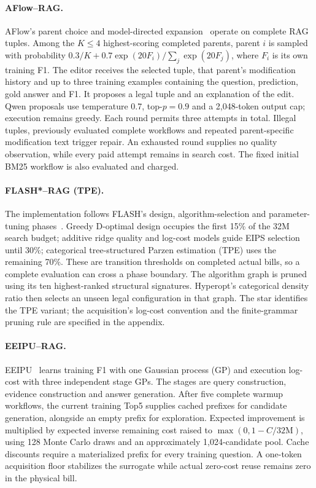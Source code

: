 \paragraph{AFlow--RAG.}
AFlow's parent choice and model-directed expansion~\citep{zhang2024aflow}
operate on complete RAG tuples. Among the $K\leq4$ highest-scoring completed
parents, parent $i$ is sampled with probability
$0.3/K+0.7\exp(20F_i)/\sum_j\exp(20F_j)$, where $F_i$ is its own training
F1. The editor receives the selected tuple, that parent's modification
history and up to three training examples containing the question,
prediction, gold answer and F1. It proposes a legal tuple and an explanation
of the edit. Qwen proposals use temperature 0.7, top-$p=0.9$ and a
2,048-token output cap; execution remains greedy. Each round permits three
attempts in total. Illegal tuples, previously evaluated complete workflows
and repeated parent-specific modification text trigger repair. An exhausted
round supplies no quality observation, while every paid attempt remains in
search cost. The fixed initial BM25 workflow is also evaluated and charged.

\paragraph{FLASH*--RAG (TPE).}
The implementation follows FLASH's design, algorithm-selection and
parameter-tuning phases~\citep{zhang2016flash}. Greedy D-optimal design
occupies the first 15\% of the 32M search budget; additive ridge quality and
log-cost models guide EIPS selection until 30\%; categorical tree-structured
Parzen estimation (TPE) uses the remaining 70\%. These are transition
thresholds on completed actual bills, so a complete evaluation can cross a
phase boundary. The algorithm graph is pruned using its ten highest-ranked
structural signatures. Hyperopt's categorical density ratio then selects an
unseen legal configuration in that graph. The star identifies the TPE variant;
the acquisition's log-cost convention and the finite-grammar pruning rule
are specified in the appendix.

\paragraph{EEIPU--RAG.}
EEIPU~\citep{essofi2024memoization} learns training F1 with one Gaussian
process (GP) and execution log-cost with three independent stage GPs. The
stages are query construction, evidence construction and answer generation.
After five complete warmup workflows, the current training Top5 supplies
cached prefixes for candidate generation, alongside an empty prefix for
exploration. Expected improvement is multiplied by expected inverse
remaining cost raised to $\max(0,1-C/32\mathrm{M})$, using 128 Monte Carlo
draws and an approximately 1,024-candidate pool. Cache discounts require a
materialized prefix for every training question. A one-token acquisition
floor stabilizes the surrogate while actual zero-cost reuse remains zero
in the physical bill.

